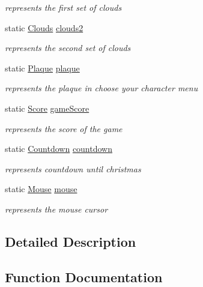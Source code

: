 \begin{DoxyCompactItemize}
\begin{DoxyCompactList}\small\item\em represents the first set of clouds \end{DoxyCompactList}\item 
static \hyperlink{struct_clouds}{Clouds} \hyperlink{group___graphics_gad6ab919c4fef2f8337350a9ce79299a9}{clouds2}
\begin{DoxyCompactList}\small\item\em represents the second set of clouds \end{DoxyCompactList}\item 
static \hyperlink{struct_plaque}{Plaque} \hyperlink{group___graphics_ga34de8a6bdc6062347016b82e556b42a7}{plaque}
\begin{DoxyCompactList}\small\item\em represents the plaque in choose your character menu \end{DoxyCompactList}\item 
static \hyperlink{struct_score}{Score} \hyperlink{group___graphics_ga8e77a1d25d66a81c79d37786002474c5}{game\+Score}
\begin{DoxyCompactList}\small\item\em represents the score of the game \end{DoxyCompactList}\item 
static \hyperlink{struct_countdown}{Countdown} \hyperlink{group___graphics_ga94449fd3ac7dc9c0f223ad7cab4d7287}{countdown}
\begin{DoxyCompactList}\small\item\em represents countdown until christmas \end{DoxyCompactList}\item 
static \hyperlink{struct_mouse}{Mouse} \hyperlink{group___graphics_ga07faa847230d0abd8c3db00e3f8cae7a}{mouse}
\begin{DoxyCompactList}\small\item\em represents the mouse cursor \end{DoxyCompactList}\end{DoxyCompactItemize}


\subsection{Detailed Description}


\subsection{Function Documentation}
\mbox{\label{group___graphics_ga1ff7208d640a7d4c62a49f5f81306be4}} 
